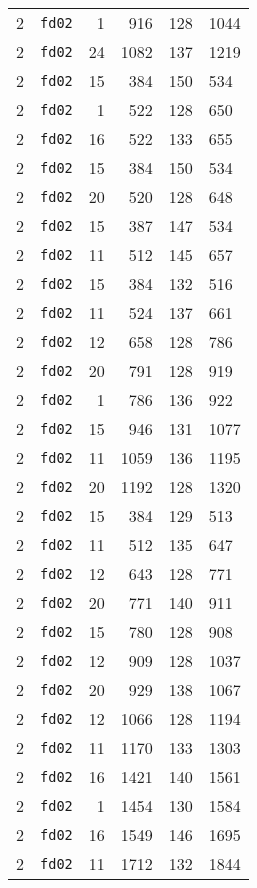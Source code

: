\documentclass{article}
\begin{document}
\begin{table}[h!]
\begin{tabular}{llrrrl}
    2 & \texttt{fd02} & 1 & 916 & 128 & 1044 \\
    2 & \texttt{fd02} & 24 & 1082 & 137 & 1219 \\
    2 & \texttt{fd02} & 15 & 384 & 150 & 534 \\
    2 & \texttt{fd02} & 1 & 522 & 128 & 650 \\
    2 & \texttt{fd02} & 16 & 522 & 133 & 655 \\
    2 & \texttt{fd02} & 15 & 384 & 150 & 534 \\
    2 & \texttt{fd02} & 20 & 520 & 128 & 648 \\
    2 & \texttt{fd02} & 15 & 387 & 147 & 534 \\
    2 & \texttt{fd02} & 11 & 512 & 145 & 657 \\
    2 & \texttt{fd02} & 15 & 384 & 132 & 516 \\
    2 & \texttt{fd02} & 11 & 524 & 137 & 661 \\
    2 & \texttt{fd02} & 12 & 658 & 128 & 786 \\
    2 & \texttt{fd02} & 20 & 791 & 128 & 919 \\
    2 & \texttt{fd02} & 1 & 786 & 136 & 922 \\
    2 & \texttt{fd02} & 15 & 946 & 131 & 1077 \\
    2 & \texttt{fd02} & 11 & 1059 & 136 & 1195 \\
    2 & \texttt{fd02} & 20 & 1192 & 128 & 1320 \\
    2 & \texttt{fd02} & 15 & 384 & 129 & 513 \\
    2 & \texttt{fd02} & 11 & 512 & 135 & 647 \\
    2 & \texttt{fd02} & 12 & 643 & 128 & 771 \\
    2 & \texttt{fd02} & 20 & 771 & 140 & 911 \\
    2 & \texttt{fd02} & 15 & 780 & 128 & 908 \\
    2 & \texttt{fd02} & 12 & 909 & 128 & 1037 \\
    2 & \texttt{fd02} & 20 & 929 & 138 & 1067 \\
    2 & \texttt{fd02} & 12 & 1066 & 128 & 1194 \\
    2 & \texttt{fd02} & 11 & 1170 & 133 & 1303 \\
    2 & \texttt{fd02} & 16 & 1421 & 140 & 1561 \\
    2 & \texttt{fd02} & 1 & 1454 & 130 & 1584 \\
    2 & \texttt{fd02} & 16 & 1549 & 146 & 1695 \\
    2 & \texttt{fd02} & 11 & 1712 & 132 & 1844 \\

\end{tabular}
\end{table}
\end{document}
